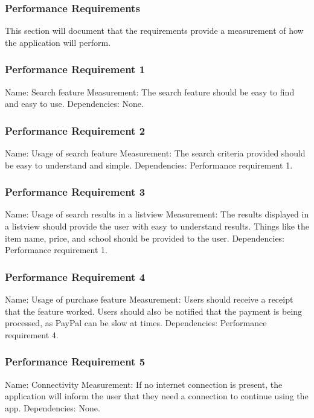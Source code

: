 \documentclass[journal,compsoc, 10pt, draftclsnofoot, onecolumn]{IEEEtran}
\begin{document}
\subsubsection{Performance Requirements}

This section will document that the requirements provide a measurement of how 
the application will perform.

\subsubsection*{Performance Requirement 1}
Name: Search feature\newline
Measurement: The search feature should be easy to find and easy to use.\newline
Dependencies: None.

\subsubsection*{Performance Requirement 2}
Name: Usage of search feature\newline
Measurement: The search criteria provided should be easy to understand and 
simple.\newline
Dependencies: Performance requirement 1.

\subsubsection*{Performance Requirement 3}
Name: Usage of search results in a listview\newline
Measurement: The results displayed in a listview should provide the user with 
easy to understand results. Things like the item name, price, and school should 
be provided to the user.\newline
Dependencies: Performance requirement 1.

\subsubsection*{Performance Requirement 4}
Name: Usage of purchase feature\newline
Measurement: Users should receive a receipt that the feature worked. Users 
should also be notified that the payment is being processed, as PayPal can
be slow at times.\newline 
Dependencies: Performance requirement 4.

\subsubsection*{Performance Requirement 5}
Name: Connectivity \newline
Measurement: If no internet connection is present, the application will inform
the user that they need a connection to continue using the app.
Dependencies: None.
\end{document}
